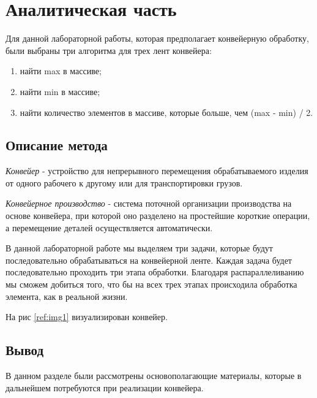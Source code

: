 \chapter{Аналитическая часть}

Для данной лабораторной работы, которая предполагает конвейерную обработку,
были выбраны три алгоритма для трех лент конвейера:

\begin{enumerate}
	\item найти max в массиве;
	\item найти min в массиве;
	\item найти количество элементов в массиве, которые больше,
	      чем (max - min) / 2.
\end{enumerate}

\section{Описание метода}

\textit{Конвейер} - устройство для непрерывного перемещения обрабатываемого
изделия от одного рабочего к другому или для транспортировки грузов.

\textit{Конвейерное производство} - система поточной организации производства на основе конвейера,
при которой оно разделено на простейшие короткие операции, а перемещение деталей осуществляется автоматически.

В данной лабораторной работе мы выделяем три задачи, которые будут
последовательно обрабатываться на конвейерной ленте. Каждая задача
будет последовательно проходить три этапа обработки. Благодаря
распараллеливанию мы сможем добиться того, что бы на всех трех
этапах происходила обработка элемента, как в реальной жизни.

На рис \ref{ref:img1} визуализирован конвейер.

\begin{figure}[ht!]
\end{figure}


\section{Вывод}

В данном разделе были рассмотрены
основополагающие материалы, которые в дальнейшем потребуются
при реализации конвейера.
